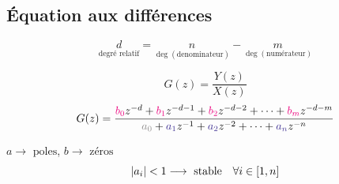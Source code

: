 \documentclass[resume]{subfiles}
\begin{document}
\subsection{Équation aux différences}
$$\underset{\text{degré relatif}}{d}=\underset{\deg(\text{denominateur})}{n}-\underset{\deg(\text{numérateur})}{m}$$
\begin{small}
$$G(z)=\frac{Y(z)}{X(z)}$$
$$G(z)=\frac{\bcolor{b_0}z^{-d}+\bcolor{b_1}z^{-d-1}+\bcolor{b_2}z^{-d-2}+\cdots+\bcolor{b_m}z^{-d-m}}{\textcolor{Gray}{a_0}+\acolor{a_1}z^{-1}+\acolor{a_2}z^{-2}+\cdots+\acolor{a_n}z^{-n}}$$
\end{small}
$a\longrightarrow \text{ poles}$, $b\longrightarrow\text{ zéros}$
$$\abs{a_i}<1\longrightarrow\text{ stable}\quad \forall i\in [1,n]$$
\end{document}
